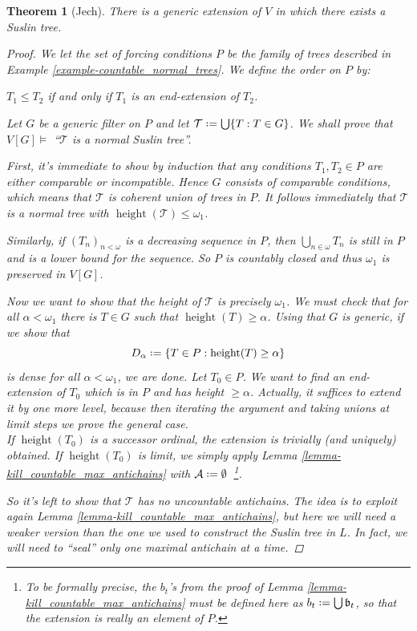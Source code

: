 \documentclass[11pt,a4paper]{report}
\newtheorem{theorem}{Theorem}[chapter] %
\theoremstyle{definition}
\theoremstyle{num.custom-title}
\theoremstyle{custom-title}
\DeclareMathOperator{\height}{height}
\newcommand{\A}{\mathcal{A}}
\newcommand{\T}{\mathcal{T}}
\newcommand*{\defeq}{\mathrel{\rlap{%
                     \raisebox{0.3ex}{$\cdot$}}%
                     \raisebox{-0.3ex}{$\cdot$}}%
                     =}
\begin{document}
\begin{theorem}[Jech] \label{thm-forcing_a_suslin_tree}
There is a generic extension of $V$ in which there exists a Suslin tree.
\begin{proof}
We let the set of forcing conditions $P$ be the family of trees described in Example \ref{example-countable_normal_trees}. We define the order on $P$ by:
\begin{center}
$T_1 \leq T_2$ if and only if $T_1$ is an end-extension of $T_2$.
\end{center}
Let $G$ be a generic filter on $P$ and let $\T \defeq \bigcup \{T : T \in G\}$. We shall prove that $V[G] \models$ ``$\T$ is a normal Suslin tree''.

First, it's immediate to show by induction that any conditions $T_1, T_2 \in P$ are either comparable or incompatible. Hence $G$ consists of comparable conditions, which means that $\T$ is coherent union of trees in $P$. It follows immediately that $\T$ is a normal tree with $\height(\T) \leq \omega_1$.

Similarly, if $(T_n)_{n < \omega}$ is a decreasing sequence in $P$, then $\bigcup_{n \in \omega} T_n$ is still in $P$ and is a lower bound for the sequence. So $P$ is countably closed and thus $\omega_1$ is preserved in $V[G]$.

Now we want to show that the height of $\T$ is precisely $\omega_1$. We must check that for all $\alpha < \omega_1$ there is $T \in G$ such that $\height(T) \geq \alpha$. Using that $G$ is generic, if we show that
\[
D_\alpha \defeq \{ T \in P : \height(T) \geq \alpha \}
\]
is dense for all $\alpha < \omega_1$, we are done. Let $T_0 \in P$. We want to find an end-extension of $T_0$ which is in $P$ and has height $\geq \alpha$. Actually, it suffices to extend it by one more level, because then iterating the argument and taking unions at limit steps we prove the general case.\\
If $\height(T_0)$ is a successor ordinal, the extension is trivially (and uniquely) obtained. If $\height(T_0)$ is limit, we simply apply Lemma \ref{lemma-kill_countable_max_antichains} with $\A \defeq \emptyset$\ \footnote{To be formally precise, the $b_t$'s from the proof of Lemma \ref{lemma-kill_countable_max_antichains} must be defined here as $b_t \defeq \bigcup \mathfrak{b}_t$, so that the extension is really an element of $P$.}.

So it's left to show that $\T$ has no uncountable antichains. The idea is to exploit again Lemma \ref{lemma-kill_countable_max_antichains}, but here we will need a weaker version than the one we used to construct the Suslin tree in $L$. In fact, we will need to ``seal'' only one maximal antichain at a time.


\end{proof}
\end{theorem}
\end{document}
